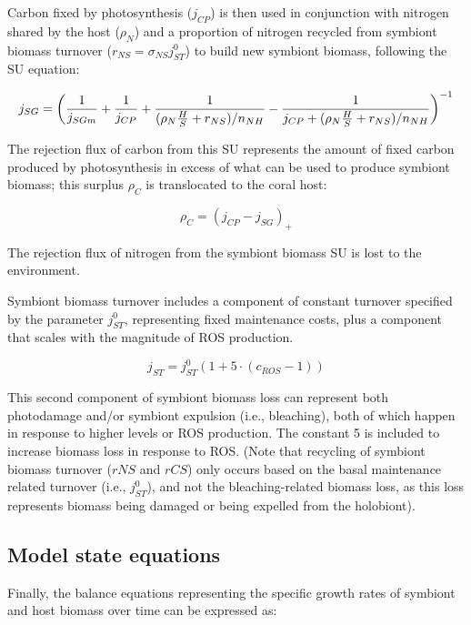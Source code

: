 \documentclass[]{elsarticle} %
\begin{document}
Carbon fixed by photosynthesis (\(j_{CP}\)) is then used in conjunction
with nitrogen shared by the host (\(\rho_N\)) and a proportion of
nitrogen recycled from symbiont biomass turnover
(\(r_{NS}=\sigma_{NS}j_{ST}^0\)) to build new symbiont biomass,
following the SU equation:

\begin{equation} j_{SG} = \bigg({1 \over j_{SGm}} + {1 \over j_{CP}} + {1 \over {(\rho_N{H \over S} + r_{NS}) / n_{NH}}} - {1 \over {j_{CP} + (\rho_N{H \over S} + r_{NS}) / n_{NH}}}\bigg)^{-1} \end{equation}

The rejection flux of carbon from this SU represents the amount of fixed
carbon produced by photosynthesis in excess of what can be used to
produce symbiont biomass; this surplus \(\rho_C\) is translocated to the
coral host:

\begin{equation} \rho_C = (j_{CP} - j_{SG})_+ \end{equation}

The rejection flux of nitrogen from the symbiont biomass SU is lost to
the environment.

Symbiont biomass turnover includes a component of constant turnover
specified by the parameter \(j_{ST}^0\), representing fixed maintenance
costs, plus a component that scales with the magnitude of ROS
production.

\begin{equation} j_{ST} = j_{ST}^0(1 + 5 \cdot (c_{ROS}-1)) \end{equation}

This second component of symbiont biomass loss can represent both
photodamage and/or symbiont expulsion (i.e., bleaching), both of which
happen in response to higher levels or ROS production. The constant 5 is
included to increase biomass loss in response to ROS. (Note that
recycling of symbiont biomass turnover (\(rNS\) and \(rCS\)) only occurs
based on the basal maintenance related turnover (i.e., \(j_{ST}^0\)),
and not the bleaching-related biomass loss, as this loss represents
biomass being damaged or being expelled from the holobiont).

\subsection{Model state equations}\label{model-state-equations}

Finally, the balance equations representing the specific growth rates of
symbiont and host biomass over time can be expressed as:
\end{document}
